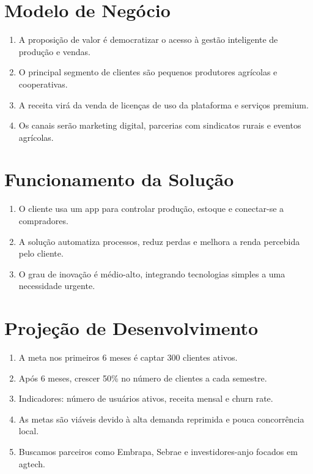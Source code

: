 \documentclass{article}
\begin{document}
\section*{Modelo de Negócio}
\begin{enumerate}[label=\arabic*.]
    \item A proposição de valor é democratizar o acesso à gestão inteligente de produção e vendas.
    \item O principal segmento de clientes são pequenos produtores agrícolas e cooperativas.
    \item A receita virá da venda de licenças de uso da plataforma e serviços premium.
    \item Os canais serão marketing digital, parcerias com sindicatos rurais e eventos agrícolas.
\end{enumerate}

\section*{Funcionamento da Solução}
\begin{enumerate}[label=\arabic*.]
    \item O cliente usa um app para controlar produção, estoque e conectar-se a compradores.
    \item A solução automatiza processos, reduz perdas e melhora a renda percebida pelo cliente.
    \item O grau de inovação é médio-alto, integrando tecnologias simples a uma necessidade urgente.
\end{enumerate}

\section*{Projeção de Desenvolvimento}
\begin{enumerate}[label=\arabic*.]
    \item A meta nos primeiros 6 meses é captar 300 clientes ativos.
    \item Após 6 meses, crescer 50\% no número de clientes a cada semestre.
    \item Indicadores: número de usuários ativos, receita mensal e churn rate.
    \item As metas são viáveis devido à alta demanda reprimida e pouca concorrência local.
    \item Buscamos parceiros como Embrapa, Sebrae e investidores-anjo focados em agtech.
\end{enumerate}
\end{document}

